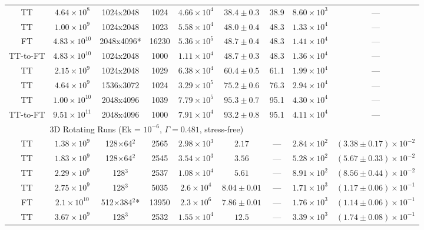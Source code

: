 \begin{table}[ht]
\begin{center}
{\begin{tabular}{c c c c c c c c c}
TT			&	$4.64 \times 10^8$		&	1024x2048	&	1024		&	$4.66 \times 10^4$	&	$38.4 \pm 0.3$	&	38.9	&	$8.60 \times 10^3$ & --- \\
TT			&	$1.00 \times 10^9$		&	1024x2048	&	1023		&	$5.58 \times 10^4$	&	$48.0 \pm 0.4$	&	48.3	&	$1.33 \times 10^4$ & --- \\
FT			&	$4.83 \times 10^{10}$	&	2048x4096*	&	16230		&	$5.36 \times 10^5$	&	$48.7 \pm 0.4$	&	48.3	&	$1.41 \times 10^4$ & --- \\
TT-to-FT	&	$4.83 \times 10^{10}$	&	1024x2048	&	1000		&	$1.11 \times 10^4$	&	$48.7 \pm 0.3$	&	48.3	&	$1.36 \times 10^4$ & --- \\
TT			&	$2.15 \times 10^9$		&	1024x2048	&	1029		&	$6.38 \times 10^4$	&	$60.4 \pm 0.5$	&	61.1	&	$1.99 \times 10^4$ & --- \\
TT			&	$4.64 \times 10^9$		&	1536x3072	&	1024		&	$3.29 \times 10^5$	&	$75.2 \pm 0.6$	&	76.3	&	$2.94 \times 10^4$ & --- \\
TT			&	$1.00 \times 10^{10}$	&	2048x4096	&	1039		&	$7.79 \times 10^5$	&	$95.3 \pm 0.7$	&	95.1	&	$4.30 \times 10^4$ & --- \\
TT-to-FT	&	$9.51 \times 10^{11}$	&	2048x4096	&	1000		&	$7.91 \times 10^4$	& 	$93.2 \pm 0.8$ 	&	95.1	&	$4.11 \times 10^4$ & --- \\
\hline																	
\multicolumn{7}{c}{\vspace{0.1cm}3D Rotating Runs (Ek = $10^{-6}$, $\Gamma = 0.481$, stress-free)} \\
\hline																	
TT	&	$1.38 \times 10^9$		&	128$\times$64$^2$	&	2565		&	$2.98 \times 10^3$	&	$2.17$			&	---		&	$2.84 \times 10^2$  & $(3.38 \pm 0.17) \times 10^{-2}$ \\
TT	&	$1.83 \times 10^9$		&	128$\times$64$^2$	&	2545		&	$3.54 \times 10^3$	&	$3.56$			&	---		&	$5.28 \times 10^2$  & $(5.67 \pm 0.33) \times 10^{-2}$ \\
TT	&	$2.29 \times 10^9$		&	128$^3$				&	2537		&	$1.08 \times 10^4$	&	$5.61$			&	---		&	$8.91 \times 10^2$  & $(8.56 \pm 0.44) \times 10^{-2}$ \\
TT	&	$2.75 \times 10^9$		&	128$^3$				&	5035		&	$2.6 \times 10^4$	&	$8.04 \pm 0.01$	&	---		&	$1.71 \times 10^3$  & $(1.17 \pm 0.06) \times 10^{-1}$ \\
FT	&	$2.1 \times 10^{10}$	&	512$\times$384$^2$*	&	13950		&	$2.3 \times 10^6$	&	$7.86 \pm 0.01$	&	---		&	$1.76 \times 10^3$  & $(1.14 \pm 0.06) \times 10^{-1}$ \\
TT	&	$3.67 \times 10^9$		&	128$^3$				&	2532		&	$1.55 \times 10^4$	&	$12.5$			&	---		&	$3.39 \times 10^3$  & $(1.74 \pm 0.08) \times 10^{-1}$ \\

\end{tabular}}
\end{center}
\end{table}
